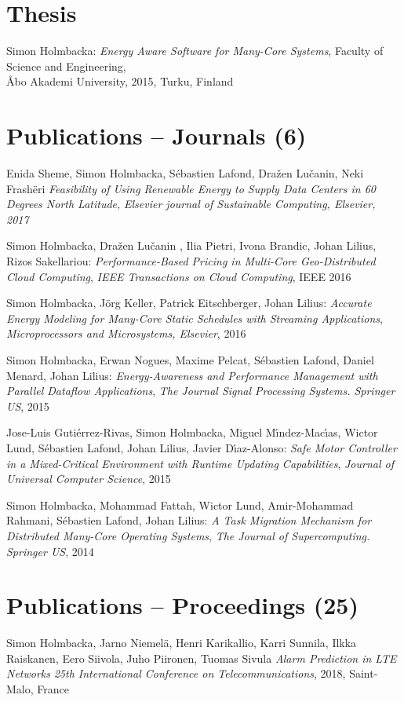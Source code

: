 \documentclass[margin,line]{resume}
\begin{document}
\begin{resume}
\section{\mysidestyle Thesis}    
Simon Holmbacka:
\textit{Energy Aware Software for Many-Core Systems},
Faculty of Science and Engineering,\\ \AA{}bo Akademi University, 2015, Turku, Finland

\section{\mysidestyle Publications -- Journals (6)}
Enida Sheme, Simon Holmbacka, S\'{e}bastien Lafond, Dra\v{z}en Lu\v{c}anin, Neki Frash\"{e}ri
\textit{Feasibility of Using Renewable Energy to Supply Data Centers in 60 Degrees North Latitude,}
\textsl{Elsevier journal of Sustainable Computing, Elsevier, 2017}

Simon Holmbacka, Dra\v{z}en Lu\v{c}anin , Ilia Pietri, Ivona Brandic, Johan Lilius, Rizos Sakellariou:
\textit{Performance-Based Pricing in Multi-Core Geo-Distributed Cloud Computing}, 
\textsl{IEEE Transactions on Cloud Computing}, IEEE 2016

Simon Holmbacka, J\"{o}rg Keller, Patrick Eitschberger, Johan Lilius:
\textit{Accurate Energy Modeling for Many-Core Static Schedules with Streaming Applications}, 
\textsl{Microprocessors and Microsystems, Elsevier}, 2016

Simon Holmbacka, Erwan Nogues, Maxime Pelcat, S\'{e}bastien Lafond, Daniel Menard, Johan Lilius:
\textit{Energy-Awareness and Performance Management with Parallel Dataflow Applications}, 
\textsl{The Journal Signal Processing Systems. Springer US}, 2015

Jose-Luis Guti\'{e}rrez-Rivas, Simon Holmbacka, Miguel M\'{\i}ndez-Mac\'{\i}as, Wictor Lund, S\'{e}bastien Lafond, Johan Lilius, Javier D\'{\i}az-Alonso:
\textit{Safe Motor Controller in a Mixed-Critical Environment with Runtime Updating Capabilities}, 
\textsl{Journal of Universal Computer Science}, 2015

Simon Holmbacka, Mohammad Fattah, Wictor Lund, Amir-Mohammad Rahmani, S\'{e}bastien Lafond, Johan Lilius:
\textit{A Task Migration Mechanism for Distributed Many-Core Operating Systems}, 
\textsl{The Journal of Supercomputing. Springer US}, 2014 


\section{\mysidestyle Publications -- Proceedings (25)}
Simon Holmbacka, Jarno Niemel\"{a}, Henri Karikallio, Karri Sunnila, Ilkka Raiskanen, Eero Siivola, Juho Piironen, Tuomas Sivula
\textit{Alarm Prediction in LTE Networks}
\textsl{25th International Conference on Telecommunications}, 2018, Saint-Malo, France


\end{resume}
\end{document}
